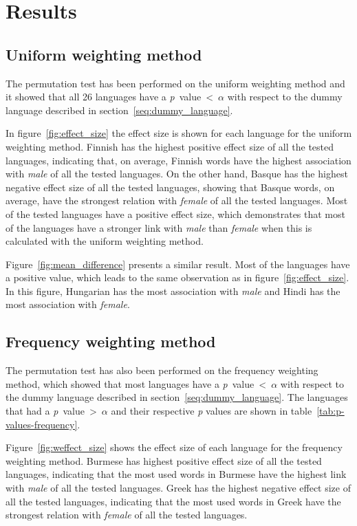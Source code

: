 \section{Results}
\subsection{Uniform weighting method}
The permutation test has been performed on the uniform weighting method and it showed that
all 26 languages have a \mbox{\emph{p} value < $\alpha$} with respect to
the dummy language described in section~\ref{seq:dummy_language}. 

In figure~\ref{fig:effect_size} the effect size is shown for each language for the
uniform weighting method.
Finnish has the highest positive effect size of all the tested languages, indicating that,
on average,
Finnish words have the highest association with \emph{male} of all the tested languages.
On the other hand, Basque has the highest negative effect size of all the tested languages,
showing that Basque words, on average, have the strongest relation with \emph{female} of
all the tested languages.
Most of the tested languages have a positive effect size, which demonstrates that most of
the languages have a stronger link with \emph{male} than \emph{female} when this
is calculated with the uniform weighting method.

Figure~\ref{fig:mean_difference} presents a similar result. Most of the languages
have a positive value, which leads to the same observation as in
figure~\ref{fig:effect_size}. In this figure, Hungarian has the most 
association with \emph{male} and Hindi has the most association with \emph{female}.

\subsection{Frequency weighting method}
The permutation test has also been performed on the frequency weighting method,
which showed that most languages have a \mbox{\emph{p} value < $\alpha$} with respect to
the dummy language described in section~\ref{seq:dummy_language}. The languages
that had a \mbox{\emph{p} value > $\alpha$} and their respective \emph{p} values
are shown in table~\ref{tab:p-values-frequency}.

Figure~\ref{fig:weffect_size} shows the effect size of each language for the
frequency weighting method.
Burmese has highest positive effect size of all the tested languages, indicating that
the most used words in Burmese have the highest link with \emph{male} of all the
tested languages.
Greek has the highest negative effect size of all the tested languages, indicating that
the most used words in Greek have the strongest relation with \emph{female} of all the
tested languages.

